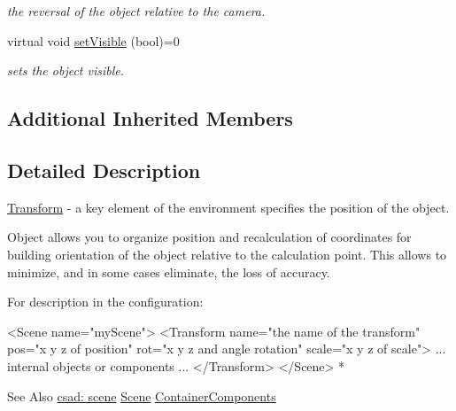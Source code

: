 \begin{DoxyCompactItemize}
\begin{DoxyCompactList}\small\item\em the reversal of the object relative to the camera. \end{DoxyCompactList}\item 
\hypertarget{classcsad_1_1_transform_a124a674bcb2d3c0147d713d64e90a17c}{virtual void \hyperlink{classcsad_1_1_transform_a124a674bcb2d3c0147d713d64e90a17c}{set\-Visible} (bool)=0}\label{classcsad_1_1_transform_a124a674bcb2d3c0147d713d64e90a17c}

\begin{DoxyCompactList}\small\item\em sets the object visible. \end{DoxyCompactList}\end{DoxyCompactItemize}
\subsection*{Additional Inherited Members}


\subsection{Detailed Description}
\hyperlink{classcsad_1_1_transform}{Transform} -\/ a key element of the environment specifies the position of the object. 

Object allows you to organize position and recalculation of coordinates for building orientation of the object relative to the calculation point. This allows to minimize, and in some cases eliminate, the loss of accuracy.

For description in the configuration\-: \begin{DoxyVerb}  <Scene name="myScene">
    <Transform name="the name of the transform" pos="x y z of position" rot="x y z and angle rotation" scale="x y z of scale">
      ... internal objects or components ...
    </Transform>
  </Scene>
* \end{DoxyVerb}


\begin{DoxySeeAlso}{See Also}
\hyperlink{group__scene}{csad\-: scene} \hyperlink{classcsad_1_1_scene}{Scene} \hyperlink{classcsad_1_1_container_components}{Container\-Components} 
\end{DoxySeeAlso}


